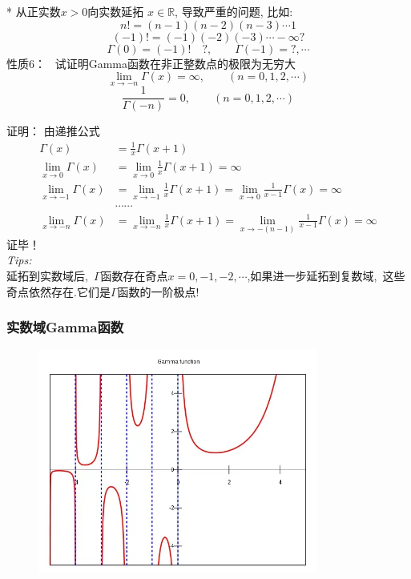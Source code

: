 \begin{frame}
	* 从正实数$x>0$向实数延拓 $x \in \mathbb{R} $, 导致严重的问题, 比如: 
	\[ n! =(n-1)(n-2)(n-3)\cdots 1\]
	\[ (-1)! =(-1)(-2)(-3)\cdots -\infty ? \] 
	\[\Gamma(0)= (-1)! \quad ? , \qquad \Gamma(-1)=?, \cdots\] 
	\alert{性质6：} ~试证明Gamma函数在非正整数点的极限为无穷大
	\begin{equation*}
		\lim\limits_{x\to -n }\Gamma(x)=\infty, \qquad (n=0,1,2, \cdots)
	\end{equation*}	
		\[ \frac{1}{\Gamma(-n)} =0, \qquad (n=0,1,2, \cdots) \]
\end{frame}		
\begin{frame}
\alert{证明：}  由递推公式
	\begin{equation*}
	\begin{split}
		\Gamma(x)&=\frac{1}{x} \Gamma(x+1) \\
		\lim\limits_{x\to 0 }	\Gamma(x)&=	\lim\limits_{x\to 0 } \frac{1}{x} \Gamma(x+1) =\infty \\
		\lim\limits_{x\to -1 }	\Gamma(x)&=\lim\limits_{x\to -1 } \frac{1}{x} \Gamma(x+1) =  \lim\limits_{x\to 0 } \frac{1}{x-1} \Gamma(x) =\infty \\
		& \cdots \cdots	\\	
		\lim\limits_{x\to -n }	\Gamma(x)&=\lim\limits_{x\to -n } \frac{1}{x} \Gamma(x+1) = \lim\limits_{x\to -(n-1) } \frac{1}{x-1} \Gamma(x) =\infty  
	\end{split}
	\end{equation*}	
	证毕！ \\ \vspace{1em}
\alert{\textit{Tips:\hspace{1em}}} \\ 
延拓到实数域后, $\Gamma$函数存在奇点$x = 0,-1,-2,\cdots$,如果进一步延拓到复数域, 这些奇点依然存在.它们是$\Gamma$函数的一阶极点!
\end{frame}	

\begin{frame}
	\frametitle{实数域Gamma函数}
  \begin{center}
	   \includegraphics[width=0.85\textwidth,height=2.9in]{figs/2022-04-03-09-17-41.png}
  \end{center}
\end{frame}

